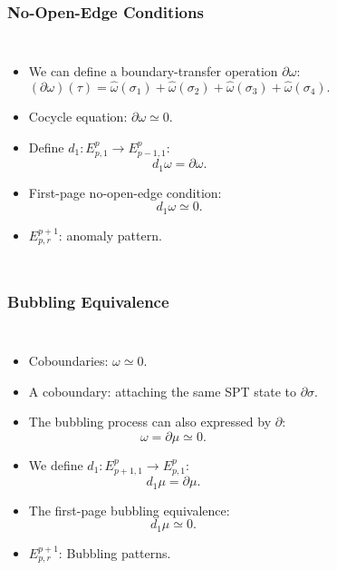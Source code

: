 \documentclass[xcolor=table, 10pt, aspectratio=43]{beamer}
\begin{document}
\begin{frame}
	\frametitle{No-Open-Edge Conditions}
	\begin{columns}
		\begin{itemize}
			\item We can define a boundary-transfer operation $\partial\omega$:
			\[(\partial\omega)(\tau)=\hat\omega(\sigma_1)
			+\hat\omega(\sigma_2)+\hat\omega(\sigma_3)+\hat\omega(\sigma_4).\]
			\item Cocycle equation: $\partial\omega\simeq0.$
			\item Define $d_1: E^p_{p,1}\rightarrow E^p_{p-1,1}$:
			\[d_1\omega = \partial\omega.\]
			\item First-page no-open-edge condition:
			\[d_1\omega \simeq 0.\]
			\item $E^{p+1}_{p,r}$: anomaly pattern.
		\end{itemize}
	\end{columns}
\end{frame}

\begin{frame}
	\frametitle{Bubbling Equivalence}
\begin{columns}
\begin{itemize}
\item Coboundaries: $\omega\simeq0$.
\item A coboundary: attaching the same SPT state to  $\partial \sigma$.
\item The bubbling process can also expressed by $\partial$:
\[\omega = \partial\mu\simeq0.\]
\item We define $d_1:E^p_{p+1, 1}\rightarrow E^p_{p,1}$:
\[d_1\mu = \partial\mu.\]
\item The first-page bubbling equivalence:
\[d_1\mu\simeq0.\]
\item $E^{p+1}_{p,r}$: Bubbling patterns.
\end{itemize}
\begin{animateinline}{5}
\end{animateinline}
\end{columns}
\end{frame}
\end{document}
